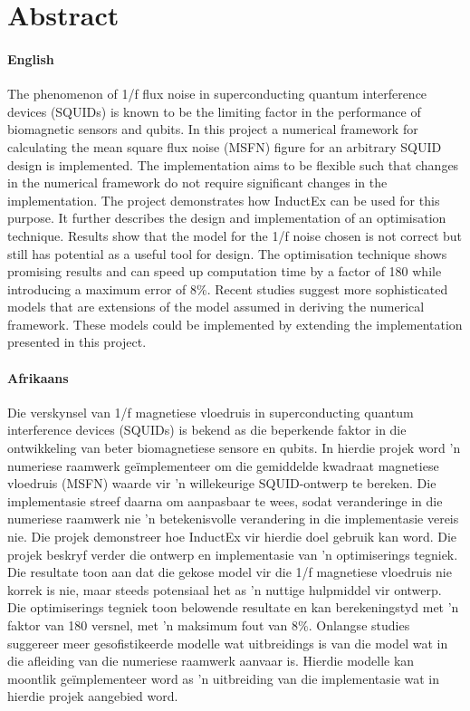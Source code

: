 \chapter*{Abstract}
\makeatletter{}\makeatother

\subsubsection*{English}

The phenomenon of 1/f flux noise in superconducting quantum interference devices (SQUIDs) is known to be the limiting factor in the performance of biomagnetic sensors and qubits. In this project a numerical framework for calculating the mean square flux noise (MSFN) figure for an arbitrary SQUID design is implemented. The implementation aims to be flexible such that changes in the numerical framework do not require significant changes in the implementation. The project demonstrates how InductEx can be used for this purpose. It further describes the design and implementation of an optimisation technique. Results show that the model for the 1/f noise chosen is not correct but still has potential as a useful tool for design. The optimisation technique shows promising results and can speed up computation time by a factor of 180 while introducing a maximum error of $8\%$. Recent studies suggest more sophisticated models that are extensions of the model assumed in deriving the numerical framework. These models could be implemented by extending the implementation presented in this project.

\subsubsection*{Afrikaans}

Die verskynsel van 1/f  magnetiese vloedruis in superconducting quantum interference devices (SQUIDs) is bekend as die beperkende faktor in die ontwikkeling van beter biomagnetiese sensore en qubits. In hierdie projek word 'n numeriese raamwerk geïmplementeer om die gemiddelde kwadraat magnetiese vloedruis (MSFN) waarde vir 'n willekeurige SQUID-ontwerp te bereken. Die implementasie streef daarna om aanpasbaar te wees, sodat veranderinge in die numeriese raamwerk nie 'n betekenisvolle verandering in die implementasie vereis nie. Die projek demonstreer hoe InductEx vir hierdie doel gebruik kan word. Die projek beskryf verder die ontwerp en implementasie van 'n optimiserings tegniek. Die resultate toon aan dat die gekose model vir die 1/f magnetiese vloedruis nie korrek is nie, maar steeds potensiaal het as 'n nuttige hulpmiddel vir ontwerp. Die optimiserings tegniek toon belowende resultate en kan berekeningstyd met 'n faktor van 180 versnel, met 'n maksimum fout van $8\%$. Onlangse studies suggereer meer gesofistikeerde modelle wat uitbreidings is van die model wat in die afleiding van die numeriese raamwerk aanvaar is. Hierdie modelle kan moontlik geïmplementeer word as 'n uitbreiding van die implementasie wat in hierdie projek aangebied word.

